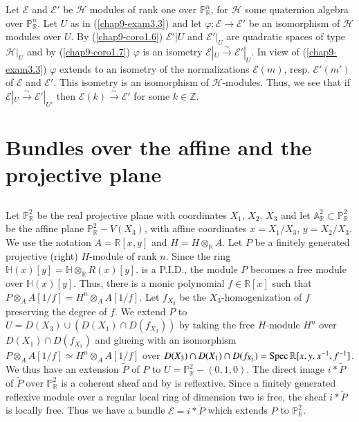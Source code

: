 Let $\mathscr{E}$ and $\mathscr{E}'$ be $\mathscr{H}$ modules of rank
one over $\mathbb{P}^{n}_{\mathbb{R}}$, for $\mathscr{H}$ some
quaternion algebra over $\mathbb{P}^{n}_{\mathbb{R}}$. Let $U$ as in
(\ref{chap9-exam3.3}) and let $\varphi:\mathscr{E}\to \mathscr{E}'$ be
an isomorphism of $\mathscr{H}$ modules over $U$. By
(\ref{chap9-coro1.6}) $\mathscr{E}'|U$ and $\mathscr{E}'|_{U}$ are
quadratic spaces of type $\mathscr{H}|_{U}$ and by
(\ref{chap9-coro1.7}) $\varphi$ is an isometry
$\mathscr{E}|_{U}\xrightarrow{\sim}\mathscr{E}'|_{U}$. In view of
(\ref{chap9-exam3.3}) $\varphi$ extends to an isometry of the
normalizations $\mathscr{E}(m)$, resp. $\mathscr{E}'(m')$ of
$\mathscr{E}$ and $\mathscr{E}'$. This isometry is an isomorphism of
$\mathscr{H}$-modules. Thus, we see that if
$\mathscr{E}|_{U}\xrightarrow{\sim}\mathscr{E}'|_{U'}$ then
$\mathscr{E}(k)\xrightarrow{\sim}\mathscr{E}'$ for some
$k\in \mathbb{Z}$. 

\section{Bundles over the affine and the projective
plane}\label{chap9-sec4}

\subsection{}\label{chap9-sec4.1}

Let $\mathbb{P}^{2}_{\mathbb{R}}$ be the real projective plane with
coordinates $X_{1}$, $X_{2}$, $X_{3}$ and let
$\mathbb{A}^{2}_{\mathbb{R}}\subset \mathbb{P}^{2}_{\mathbb{R}}$ be
the affine plane $\mathbb{P}^{2}_{\mathbb{R}}-V(X_{3})$, with affine
coordinates $x=X_{1}/X_{3}$, $y=X_{2}/X_{3}$. We use the notation
$A=\mathbb{R}[x,y]$ and $H=H\otimes_{\mathbb{R}}A$. Let $P$ be a
finitely generated projective (right) $H$-module of rank $n$. Since
the ring $\mathbb{H}(x)[y]=\mathbb{H}\otimes_{\mathbb{R}}R(x)[y]$. is
a P.I.D., the module $P$ becomes a free module over
$\mathbb{H}(x)[y]$. Thus, there is a monic polynomial
$f\in \mathbb{R}[x]$ such that
$P\otimes_{A}A[1/f]=H^{n}\otimes_{A}A[1/f]$. Let $f_{X_{3}}$ be the
$X_{3}$-homogenization of $f$ preserving the degree of $f$. We extend
$P$ to $U=D(X_{3})\cup (D(X_{1})\cap D(f_{X_{3}}))$ by taking the free
$H$-module $H^{n}$ over $D(X_{1})\cap D(f_{X_{3}})$ and glueing with an
isomorphism $P\otimes_{A}A[1/f]\simeq H^{n}\otimes_{A}A[1/f]$ over
$D(X_{3})\cap D(X_{1})\cap
D(f_{X_{3}})=\operatorname{Spec} \mathbb{R}[x,y,x^{-1},f^{-1}]$. We thus have an
extension $\widetilde{P}$ of $P$ to
$U=\mathbb{P}^{2}_{\mathbb{R}}-(0,1,0)$. The direct image
$i\ast \widetilde{P}$ of $\widetilde{P}$ over
$\mathbb{P}^{2}_{\mathbb{R}}$ is a coherent sheaf and
by \cite[p.~110]{chap9-key2} is reflextive. Since a finitely generated
reflexive module over a regular local ring of dimension two is free,
the sheaf $i\ast \widetilde{P}$ is locally free. Thus we have a bundle
$\mathscr{E}=i\ast \widetilde{P}$ which extends $P$ to
$\mathbb{P}^{2}_{\mathbb{R}}$. 


